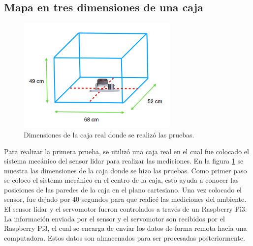 \subsection{Mapa en tres dimensiones de una caja}
\label{sec:MapaCaja}
\begin{figure}
  \centering \footnotesize
  \includegraphics[width=0.70\textwidth]{images/caja_lidar3D.png}
  \captionsetup{font=footnotesize}
  \caption{Dimensiones de la caja real donde se realizó las pruebas.}
  \label{fig:dim_cajaReal}
\end{figure}

Para realizar la primera prueba, se utilizó una caja real en el cual fue colocado 
el sistema mecánico del sensor lidar para realizar las mediciones. En la figura 
\ref{fig:dim_cajaReal} se muestra las dimensiones de la caja donde se hizo las 
pruebas. Como primer paso se coloco el sistema mecánico en el centro de la caja, esto
ayuda a conocer las posiciones de las paredes de la caja en el plano cartesiano. Una 
vez colocado el sensor, fue dejado por 40 segundos para que realicé las mediciones del 
ambiente. El sensor lidar y el servomotor fueron controlados a través de un Raspberry 
Pi3. La información enviada por el sensor y el servomotor son recibidos por el Raspberry 
Pi3, el cual se encarga de enviar los datos de forma remota hacia una computadora. Estos 
datos son almacenados para ser procesadas posteriormente.

